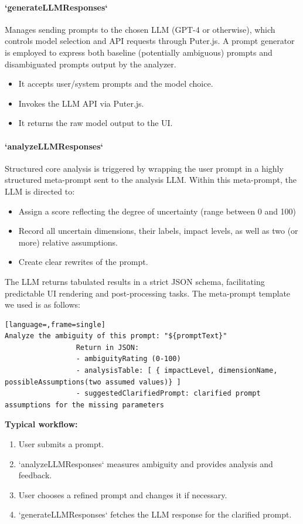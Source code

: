 \documentclass[conference]{IEEEtran}
\begin{document}
\paragraph{`generateLLMResponses`}
Manages sending prompts to the chosen LLM (GPT-4 or otherwise), which controls model selection and API requests through Puter.js. A prompt generator is employed to express both baseline (potentially ambiguous) prompts and disambiguated prompts output by the analyzer.
\begin{itemize}
    \item It accepts user/system prompts and the model choice.
    \item Invokes the LLM API via Puter.js.
    \item It returns the raw model output to the UI.
\end{itemize}

\paragraph{`analyzeLLMResponses`}
Structured core analysis is triggered by wrapping the user prompt in a highly structured meta-prompt sent to the analysis LLM.
Within this meta-prompt, the LLM is directed to:
\begin{itemize}
    \item Assign a score reflecting the degree of uncertainty (range between 0 and 100)
    \item Record all uncertain dimensions, their labels, impact levels, as well as two (or more) relative assumptions.
    \item Create clear rewrites of the prompt.
\end{itemize}
The LLM returns tabulated results in a strict JSON schema, facilitating predictable UI rendering and post-processing tasks. The meta-prompt template we used is as follows:

\begin{lstlisting}[language=,frame=single]
Analyze the ambiguity of this prompt: "${promptText}"
                 Return in JSON:
                 - ambiguityRating (0-100)
                 - analysisTable: [ { impactLevel, dimensionName, possibleAssumptions(two assumed values)} ]
                 - suggestedClarifiedPrompt: clarified prompt assumptions for the missing parameters
\end{lstlisting}

\textbf{Typical workflow:}
\begin{enumerate}
    \item User submits a prompt.
    \item `analyzeLLMResponses` measures ambiguity and provides analysis and feedback.
    \item User chooses a refined prompt and changes it if necessary.
    \item `generateLLMResponses` fetches the LLM response for the clarified prompt.
\end{enumerate}
\end{document}
